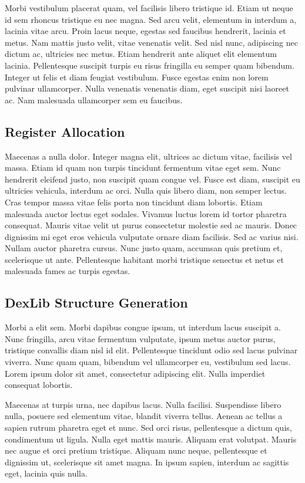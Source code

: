 \documentclass[12pt,twoside,notitlepage]{report}
\begin{document}
Morbi vestibulum placerat quam, vel facilisis libero tristique id. Etiam ut neque id sem rhoncus tristique eu nec magna. Sed arcu velit, elementum in interdum a, lacinia vitae arcu. Proin lacus neque, egestas sed faucibus hendrerit, lacinia et metus. Nam mattis justo velit, vitae venenatis velit. Sed nisl nunc, adipiscing nec dictum ac, ultricies nec metus. Etiam hendrerit ante aliquet elit elementum lacinia. Pellentesque suscipit turpis eu risus fringilla eu semper quam bibendum. Integer ut felis et diam feugiat vestibulum. Fusce egestas enim non lorem pulvinar ullamcorper. Nulla venenatis venenatis diam, eget suscipit nisi laoreet ac. Nam malesuada ullamcorper sem eu faucibus.

\subsection{Register Allocation}

Maecenas a nulla dolor. Integer magna elit, ultrices ac dictum vitae, facilisis vel massa. Etiam id quam non turpis tincidunt fermentum vitae eget sem. Nunc hendrerit eleifend justo, non suscipit quam congue vel. Fusce est diam, suscipit eu ultricies vehicula, interdum ac orci. Nulla quis libero diam, non semper lectus. Cras tempor massa vitae felis porta non tincidunt diam lobortis. Etiam malesuada auctor lectus eget sodales. Vivamus luctus lorem id tortor pharetra consequat. Mauris vitae velit ut purus consectetur molestie sed ac mauris. Donec dignissim mi eget eros vehicula vulputate ornare diam facilisis. Sed ac varius nisi. Nullam auctor pharetra cursus. Nunc justo quam, accumsan quis pretium et, scelerisque ut ante. Pellentesque habitant morbi tristique senectus et netus et malesuada fames ac turpis egestas.

\subsection{DexLib Structure Generation}

Morbi a elit sem. Morbi dapibus congue ipsum, ut interdum lacus suscipit a. Nunc fringilla, arcu vitae fermentum vulputate, ipsum metus auctor purus, tristique convallis diam nisl id elit. Pellentesque tincidunt odio sed lacus pulvinar viverra. Nunc quam quam, bibendum vel ullamcorper eu, vestibulum sed lacus. Lorem ipsum dolor sit amet, consectetur adipiscing elit. Nulla imperdiet consequat lobortis.

Maecenas at turpis urna, nec dapibus lacus. Nulla facilisi. Suspendisse libero nulla, posuere sed elementum vitae, blandit viverra tellus. Aenean ac tellus a sapien rutrum pharetra eget et nunc. Sed orci risus, pellentesque a dictum quis, condimentum ut ligula. Nulla eget mattis mauris. Aliquam erat volutpat. Mauris nec augue et orci pretium tristique. Aliquam nunc neque, pellentesque et dignissim ut, scelerisque sit amet magna. In ipsum sapien, interdum ac sagittis eget, lacinia quis nulla.
\end{document}
